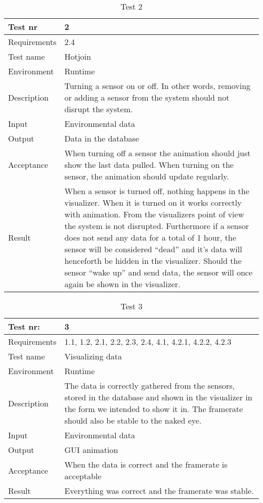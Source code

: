 \documentclass[../document]{subfiles}
\begin{document}
\begin{table}[H]
\caption{Test 2}
\centering
\begin{tabularx}{\textwidth}{|l|X|}
	\hline
	Test nr
	&2
	\\ \hline Requirements
	&2.4
	\\ \hline Test name
	&Hotjoin
	\\ \hline Environment
	&Runtime
	\\ \hline Description
	&Turning a sensor on or off. In other words, removing or adding a sensor from the system should not disrupt the system.
	\\ \hline Input
	&Environmental data
	\\ \hline Output
	&Data in the database
	\\ \hline Acceptance
	&When turning off a sensor the animation should just show the last data pulled. When turning on the sensor, the animation should update regularly.
	\\ \hline Result
	&When a sensor is turned off, nothing happens in the visualizer. When it is turned on it works correctly with animation. From the visualizers point of view the system is not disrupted. Furthermore if a sensor does not send any data for a total of 1 hour, the sensor will be considered “dead” and it’s data will henceforth be hidden in the visualizer. Should the sensor “wake up” and send data, the sensor will once again be shown in the visualizer.
	\\ \hline 
\end{tabularx}
\end{table}

\begin{table}[H]
\caption{Test 3}
\centering
\begin{tabularx}{\textwidth}{|l|X|}
	\hline
	Test nr:
	&3
	\\ \hline Requirements
	&1.1, 1.2, 2.1, 2.2, 2.3, 2.4, 4.1, 4.2.1, 4.2.2, 4.2.3
	\\ \hline Test name
	&Visualizing data
	\\ \hline Environment
	&Runtime
	\\ \hline Description
	&The data is correctly gathered from the sensors, stored in the database and shown in the visualizer in the form we intended to show it in. The framerate should also be stable to the naked eye.
	\\ \hline Input
	&Environmental data
	\\ \hline Output
	&GUI animation
	\\ \hline Acceptance
	&When the data is correct and the framerate is acceptable
	\\ \hline Result
	&Everything was correct and the framerate was stable.
	\\ \hline 
\end{tabularx}
\end{table}
\end{document}
